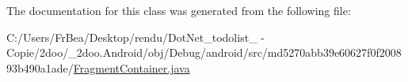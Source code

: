 The documentation for this class was generated from the following file:\begin{CompactItemize}
\item 
C:/Users/FrBea/Desktop/rendu/DotNet\_\-todolist\_ - Copie/2doo/\_\-2doo.Android/obj/Debug/android/src/md5270abb39e60627f0f200893b490a1ade/\hyperlink{_fragment_container_8java}{FragmentContainer.java}\end{CompactItemize}
